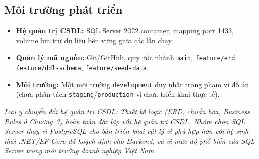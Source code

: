 \subsection{Môi trường phát triển}
\begin{itemize}
    \item \textbf{Hệ quản trị CSDL:} SQL Server 2022 container, mapping port 1433, volume lưu trữ dữ liệu bền vững giữa các lần chạy.
    \item \textbf{Quản lý mã nguồn:} Git/GitHub, quy ước nhánh \texttt{main}, \texttt{feature/erd}, \texttt{feature/ddl-schema}, \texttt{feature/seed-data}.
    \item \textbf{Môi trường:} Một môi trường \texttt{development} duy nhất trong phạm vi đồ án (chưa phân tách \texttt{staging}/\texttt{production} vì chưa triển khai thực tế).
\end{itemize}

\textit{Lưu ý chuyển đổi hệ quản trị CSDL: Thiết kế logic (ERD, chuẩn hóa, Business Rules ở Chương~3) hoàn toàn độc lập với hệ quản trị CSDL. Nhóm chọn SQL Server thay vì PostgreSQL cho bản triển khai vật lý vì phù hợp hơn với hệ sinh thái .NET/EF Core đã hoạch định cho Backend, và vì mức độ phổ biến của SQL Server trong môi trường doanh nghiệp Việt Nam.}
